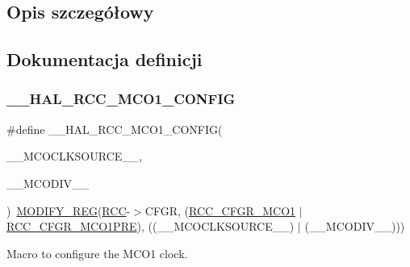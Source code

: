 \subsection{Opis szczegółowy}


\subsection{Dokumentacja definicji}
\mbox{\label{group___r_c_c_ex___m_c_ox___clock___config_ga7e5f7f1efc92794b6f0e96068240b45e}} 
\subsubsection{\texorpdfstring{\+\_\+\+\_\+\+H\+A\+L\+\_\+\+R\+C\+C\+\_\+\+M\+C\+O1\+\_\+\+C\+O\+N\+F\+IG}{\_\_HAL\_RCC\_MCO1\_CONFIG}}
{\footnotesize\ttfamily \#define \+\_\+\+\_\+\+H\+A\+L\+\_\+\+R\+C\+C\+\_\+\+M\+C\+O1\+\_\+\+C\+O\+N\+F\+IG(\begin{DoxyParamCaption}\item[{}]{\+\_\+\+\_\+\+M\+C\+O\+C\+L\+K\+S\+O\+U\+R\+C\+E\+\_\+\+\_\+,  }\item[{}]{\+\_\+\+\_\+\+M\+C\+O\+D\+I\+V\+\_\+\+\_\+ }\end{DoxyParamCaption})~\hyperlink{group___exported__macro_ga6553c99f510c3bab8cc0a91602053247}{M\+O\+D\+I\+F\+Y\+\_\+\+R\+EG}(\hyperlink{group___peripheral__declaration_ga74944438a086975793d26ae48d5882d4}{R\+CC}-\/$>$C\+F\+GR, (\hyperlink{group___peripheral___registers___bits___definition_ga26eb4a66eeff0ba17e9d2a06cf937ca4}{R\+C\+C\+\_\+\+C\+F\+G\+R\+\_\+\+M\+C\+O1} $\vert$ \hyperlink{group___peripheral___registers___bits___definition_ga23171ca70972a106109a6e0804385ec5}{R\+C\+C\+\_\+\+C\+F\+G\+R\+\_\+\+M\+C\+O1\+P\+RE}), ((\+\_\+\+\_\+\+M\+C\+O\+C\+L\+K\+S\+O\+U\+R\+C\+E\+\_\+\+\_\+) $\vert$ (\+\_\+\+\_\+\+M\+C\+O\+D\+I\+V\+\_\+\+\_\+)))}



Macro to configure the M\+C\+O1 clock. 


